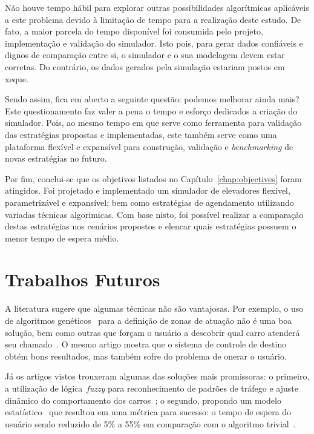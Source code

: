 Não houve tempo hábil para explorar outras possibilidades algorítmicas
aplicáveis a este problema devido à limitação de tempo para a realização deste
estudo. De fato, a maior parcela do tempo disponível foi consumida pelo projeto,
implementação e validação do simulador. Isto pois, para gerar dados confiáveis e
dignos de comparação entre si, o simulador e o sua modelagem devem estar
corretas. Do contrário, os dados gerados pela simulação estariam postos em
xeque.

Sendo assim, fica em aberto a seguinte questão: podemos melhorar ainda mais?
Este questionamento faz valer a pena o tempo e esforço dedicados a criação do
simulador. Pois, ao mesmo tempo em que serve como ferramenta para validação das
estratégias propostas e implementadas, este também serve como uma plataforma
flexível e expansível para construção, validação e \textit{benchmarking} de
novas estratégias no futuro.

Por fim, conclui-se que os objetivos listados no Capítulo~\ref{chap:objectives}
foram atingidos. Foi projetado e implementado um simulador de elevadores
flexível, parametrizável e expansível; bem como estratégias de agendamento
utilizando variadas técnicas algorimicas. Com base nisto, foi possível realizar
a comparação destas estratégias nos cenários propostos e elencar quais
estratégias possuem o menor tempo de espera médio.

\section{Trabalhos Futuros}

A literatura sugere que algumas técnicas não são vantajosas. Por exemplo, o uso
de algoritmos genéticos~\cite{KOEHLEROTTIGER02} para a definição de zonas de
atuação não é uma boa solução, bem como outras que forçam o usuário a descobrir
qual carro atenderá seu chamado~\cite{KOEHLEROTTIGER02}. O mesmo artigo mostra que o sistema de controle
de destino~\cite{KOEHLEROTTIGER02} obtém bons resultados, mas também sofre do
problema de onerar o usuário.

Já os artigos vistos trouxeram algumas das soluções mais promissoras: o
primeiro, a utilização de lógica~\textit{fuzzy} para reconhecimento de padrões
de tráfego e ajuste dinâmico do comportamento dos carros~\cite{marja97}; o
segundo, propondo um modelo estatístico~\cite{DBLP:journals/corr/abs-1212-2499}
que resultou em uma métrica para sucesso: o tempo de espera do usuário sendo
reduzido de 5\% a 55\% em comparação com o algoritmo
trivial~\cite{DBLP:journals/corr/abs-1212-2499}.

